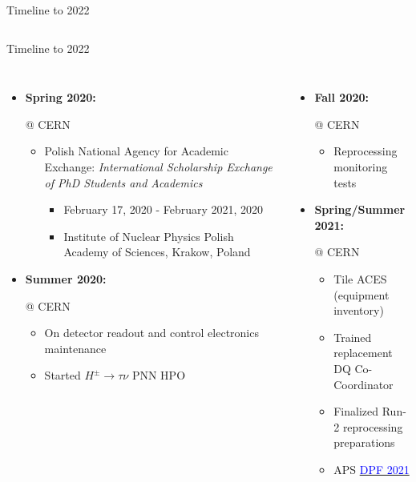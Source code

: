\documentclass[aspectratio=169,xcolor=table]{beamer}
\newcommand{\Hp}{\ensuremath{H^{\pm}}\xspace}
\newcommand{\HpLong}{\ensuremath{\Hp \rightarrow \tau \nu}\xspace}
\begin{document}
\begin{frame}[t]{Timeline to 2022}
\begin{columns}
\begin{itemize}
        \end{itemize}

    \end{columns}
  \end{frame}

  \begin{frame}[t]{Timeline to 2022}
    \begin{columns}
        \begin{itemize}

          \item \textbf{Spring 2020: } {\footnotesize{@ CERN
            \begin{itemize}
              \item Polish National Agency for Academic Exchange: \emph{International Scholarship Exchange of PhD Students and Academics}
                \begin{itemize}
                  \item February 17, 2020 - February 2021, 2020
                  \item Institute of Nuclear Physics Polish Academy of Sciences, Krakow, Poland
                \end{itemize}
            \end{itemize}}}


          \item \textbf{Summer 2020: } {\footnotesize{@ CERN
            \begin{itemize}
              \item On detector readout and control electronics maintenance
              \item Started \HpLong PNN HPO
            \end{itemize}}}

        \end{itemize}

        \begin{itemize}

          \item \textbf{Fall 2020: } {\footnotesize{@ CERN
            \begin{itemize}
              \item Reprocessing monitoring tests
            \end{itemize}}}

          \item \textbf{Spring/Summer 2021: } {\footnotesize{ @ CERN
            \begin{itemize}
              \item Tile ACES (equipment inventory)
              \item Trained replacement DQ Co-Coordinator
              \item Finalized Run-2 reprocessing preparations
              \item APS \href{https://indico.cern.ch/event/1034469/contributions/4427261/}{\textcolor{blue}{DPF 2021}}
            \end{itemize}}}


\end{itemize}
\end{columns}
\end{frame}
\end{document}
